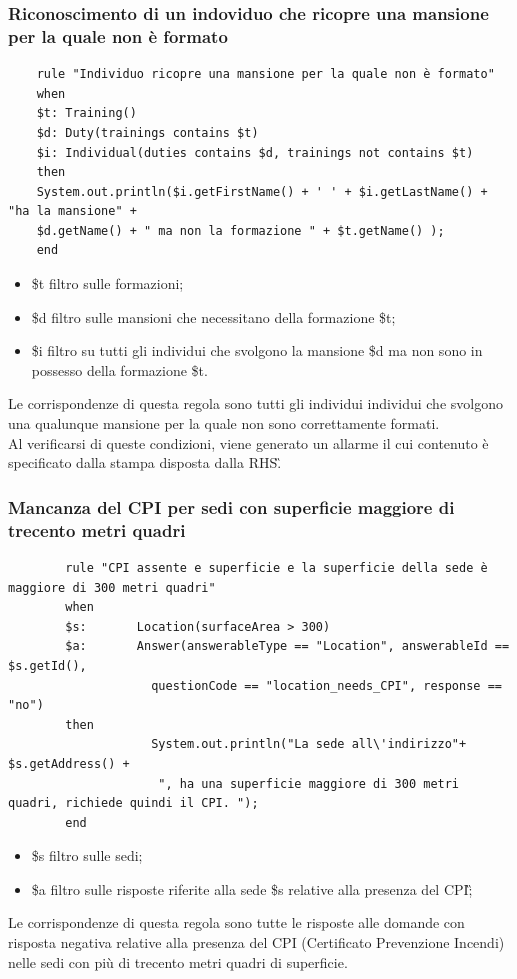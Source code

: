 \subsubsection{Riconoscimento di un indoviduo che ricopre una mansione per la quale non è formato}
	\label{Drools:regolaMansioniFormazioni}
	\begin{verbatim}
	rule "Individuo ricopre una mansione per la quale non è formato"
	when
	$t: Training()
	$d: Duty(trainings contains $t)
	$i: Individual(duties contains $d, trainings not contains $t)
	then
	System.out.println($i.getFirstName() + ' ' + $i.getLastName() + "ha la mansione" +
	$d.getName() + " ma non la formazione " + $t.getName() );
	end
	\end{verbatim}
	\begin{itemize}
		\item \$t filtro sulle formazioni;
		\item \$d filtro sulle mansioni che necessitano della formazione \$t;
		\item \$i filtro su tutti gli individui che svolgono la mansione \$d ma non sono in possesso della formazione \$t.
	\end{itemize}
	Le corrispondenze di questa regola sono tutti gli individui individui che svolgono una qualunque mansione per la quale non sono correttamente formati.\\
	Al verificarsi di queste condizioni, viene generato un allarme il cui contenuto è specificato dalla stampa disposta dalla \gls{RHS}\G.
	
\subsubsection{Mancanza del CPI per sedi con superficie maggiore di trecento metri quadri}
\label{Drools:regolaCPISuperficie}

	\begin{verbatim}
		rule "CPI assente e superficie e la superficie della sede è  maggiore di 300 metri quadri"
		when
		$s: 	  Location(surfaceArea > 300)
		$a: 	  Answer(answerableType == "Location", answerableId == $s.getId(), 
					questionCode == "location_needs_CPI", response == "no")
		then
					System.out.println("La sede all\'indirizzo"+ $s.getAddress() +
					 ", ha una superficie maggiore di 300 metri quadri, richiede quindi il CPI. ");
		end
	\end{verbatim}

	\begin{itemize}
		\item \$s filtro sulle sedi;
		\item \$a filtro sulle risposte riferite alla sede \$s relative alla presenza del \gls{CPI}\G;
	\end{itemize}
	Le corrispondenze di questa regola sono tutte le risposte alle domande con risposta negativa relative alla presenza del CPI (Certificato Prevenzione Incendi) nelle sedi con più di trecento metri quadri di superficie.

